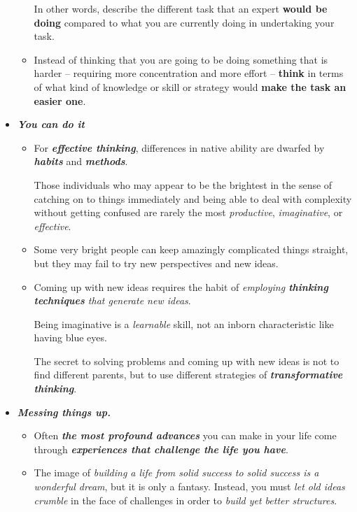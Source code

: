 \documentclass[11pt]{article}
\begin{document}
\begin{itemize}
\begin{exercise}
\begin{itemize}
In other words, describe the different task that an expert \textbf{would be doing} compared to what you are currently doing in undertaking your task.

\item Instead of thinking that you are going to be doing something that is harder -- requiring more concentration and more effort -- \textbf{think} in terms of what kind of knowledge or skill or strategy would \textbf{make the task an easier one}.
\end{itemize}
\end{exercise}

\item \emph{\textbf{You can do it}}
\begin{itemize}
\item For \emph{\textbf{effective thinking}}, differences in native ability are dwarfed by \textbf{\emph{habits}} and \emph{\textbf{methods}}. 

Those individuals who may appear to be the brightest in the sense of catching on to things immediately and being able to deal with complexity without getting confused are rarely the most \emph{productive}, \emph{imaginative}, or \emph{effective}.

\item Some very bright people can keep amazingly complicated things straight, but they may fail to try new perspectives and new ideas. 

\item Coming up with new ideas requires the habit of \emph{employing \textbf{thinking techniques} that generate new ideas}. 

Being imaginative is a \emph{learnable} skill, not an inborn characteristic like having blue eyes. 

The secret to solving problems and coming up with new ideas is not to find different parents, but to use different strategies of \emph{\textbf{transformative thinking}}.
\end{itemize}

\item \emph{\textbf{Messing things up.}} 
\begin{itemize}
\item Often \emph{\textbf{the most profound advances}} you can make in your life come through \emph{\textbf{experiences that challenge the life you have}}. 

\item The image of \emph{building a life from solid success to solid success is a wonderful dream}, but it is only a fantasy. Instead, you must \emph{let old ideas crumble} in the face of challenges in order to \emph{build yet better structures}.


\end{itemize}
\end{itemize}
\end{document}
